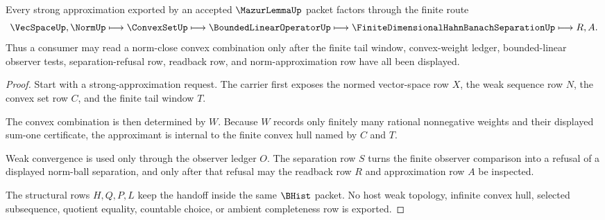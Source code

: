 \begin{theorem}
\label{thm:mazur-lemma-weak-strong-convex-handoff}
Every strong approximation exported by an accepted $\MazurLemmaUp$ packet factors through the finite route
$$
\VecSpaceUp,\NormUp \longmapsto \ConvexSetUp \longmapsto
\BoundedLinearOperatorUp \longmapsto
\FiniteDimensionalHahnBanachSeparationUp \longmapsto R,A .
$$
Thus a consumer may read a norm-close convex combination only after the finite tail window, convex-weight ledger, bounded-linear observer tests, separation-refusal row, readback row, and norm-approximation row have all been displayed.
\end{theorem}
\begin{proof}
Start with a strong-approximation request. The carrier first exposes the normed vector-space row $X$, the weak sequence row $N$, the convex set row $C$, and the finite tail window $T$.

The convex combination is then determined by $W$. Because $W$ records only finitely many rational nonnegative weights and their displayed sum-one certificate, the approximant is internal to the finite convex hull named by $C$ and $T$.

Weak convergence is used only through the observer ledger $O$. The separation row $S$ turns the finite observer comparison into a refusal of a displayed norm-ball separation, and only after that refusal may the readback row $R$ and approximation row $A$ be inspected.

The structural rows $H,Q,P,L$ keep the handoff inside the same $\BHist$ packet. No host weak topology, infinite convex hull, selected subsequence, quotient equality, countable choice, or ambient completeness row is exported.
\end{proof}



